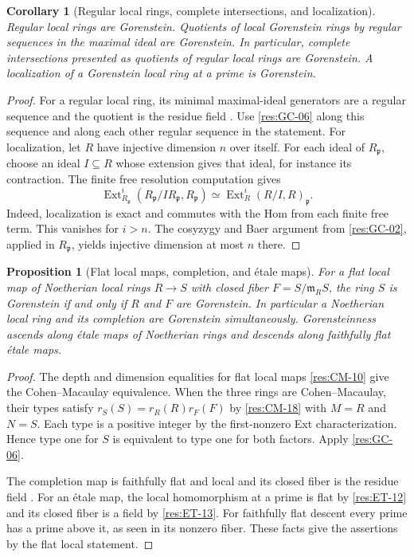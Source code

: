 \documentclass[11pt,oneside,openany]{book}
\newtheorem{proposition}[theorem]{Proposition}
\newtheorem{corollary}[theorem]{Corollary}
\theoremstyle{definition}
\theoremstyle{remark}
\begin{document}
\begin{corollary}[Regular local rings, complete intersections, and localization]
\label{res:GC-07}
Regular local rings are Gorenstein. Quotients of local Gorenstein
rings by regular sequences in the maximal ideal are Gorenstein.
In particular, complete intersections presented as quotients
of regular local rings are Gorenstein. A localization of a
Gorenstein local ring at a prime is Gorenstein.
\end{corollary}
\begin{proof}
For a regular local ring, its minimal maximal-ideal generators
are a regular sequence and the quotient is the residue field
\cite[ALG-05-C03-S03]{p103}. Use \ref{res:GC-06} along this
sequence and along each other regular sequence in the statement.
For localization, let $R$ have injective dimension $n$ over itself.
For each ideal of $R_{\mathfrak p}$, choose an ideal $I\subseteq R$
whose extension gives that ideal, for instance its contraction.
The finite free resolution computation gives
\[
 \operatorname{Ext}^i_{R_{\mathfrak p}}
 (R_{\mathfrak p}/I R_{\mathfrak p},R_{\mathfrak p})
 \simeq \operatorname{Ext}^i_R(R/I,R)_{\mathfrak p}.
\]
Indeed, localization is exact and commutes with the Hom from
each finite free term. This vanishes for $i>n$.
The cosyzygy and Baer argument from \ref{res:GC-02}, applied in
$R_{\mathfrak p}$, yields injective dimension at most $n$ there.
\end{proof}

\begin{proposition}[Flat local maps, completion, and \'{e}tale maps]
\label{res:GC-08}
For a flat local map of Noetherian local rings $R\to S$ with
closed fiber $F=S/\mathfrak m_R S$, the ring $S$ is Gorenstein
if and only if $R$ and $F$ are Gorenstein. In particular a
Noetherian local ring and its completion are Gorenstein
simultaneously. Gorensteinness ascends along \'{e}tale maps
of Noetherian rings and descends along faithfully flat
\'etale maps.
\end{proposition}
\begin{proof}
The depth and dimension equalities for flat local maps
\ref{res:CM-10} give the Cohen--Macaulay equivalence.
When the three rings are Cohen--Macaulay, their types satisfy
$r_S(S)=r_R(R)r_F(F)$ by \ref{res:CM-18} with $M=R$ and
$N=S$. Each type is a positive integer by the first-nonzero
Ext characterization. Hence type one for $S$ is equivalent
to type one for both factors. Apply \ref{res:GC-06}.

The completion map is faithfully flat and local and its
closed fiber is the residue field
\cite[ALG-05-C04-S01]{p103}. For an \'{e}tale map,
the local homomorphism at a prime is flat by \ref{res:ET-12}
and its closed fiber is a field by \ref{res:ET-13}. For
faithfully flat descent every prime has a prime above it,
as seen in its nonzero fiber. These facts give the assertions
by the flat local statement.
\end{proof}
\end{document}
